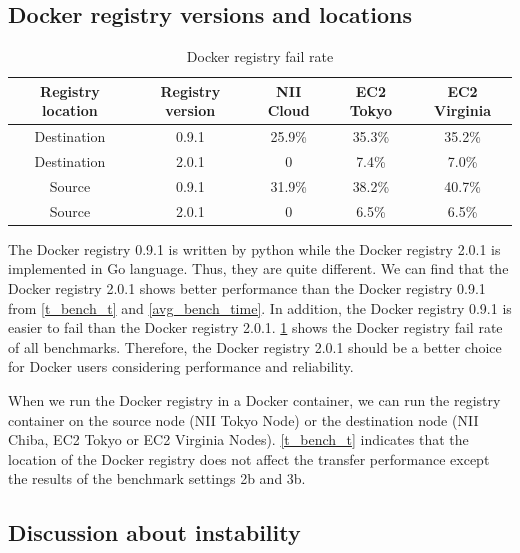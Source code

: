 \documentclass{ieicej}
\begin{document}
\subsection{Docker registry versions and locations}

\begin{table}
  \begin{tabular}{|c|c|c|c|c|}
\hline
Registry location & Registry version & NII Cloud & EC2 Tokyo & EC2 Virginia \\
\hline
Destination       & 0.9.1            & 25.9\%     & 35.3\% & 35.2\% \\
\hline
Destination       & 2.0.1            & 0         & 7.4\%  & 7.0\% \\
\hline
Source            &  0.9.1           & 31.9\%     & 38.2\% & 40.7\% \\
\hline
Source            &  2.0.1           & 0         & 6.5\%  & 6.5\% \\
  \end{tabular}
  \caption{Docker registry fail rate}
  \label{reg_fail_rate}
\end{table}


The Docker registry 0.9.1 is written by python while the Docker registry 2.0.1 is implemented in Go language.
Thus, they are quite different. We can find that the Docker registry 2.0.1 shows better performance than the Docker registry 0.9.1 from \cref{t_bench_t} and \cref{avg_bench_time}.
In addition, the Docker registry 0.9.1 is easier to fail than the Docker registry 2.0.1.
\cref{reg_fail_rate} shows the Docker registry fail rate of all benchmarks. Therefore, the Docker registry 2.0.1 should be a better choice for Docker users considering performance and reliability.

When we run the Docker registry in a Docker container, we can run the registry container on the source node (NII Tokyo Node) or the destination node (NII Chiba, EC2 Tokyo or EC2 Virginia Nodes).
\cref{t_bench_t} indicates that the location of the Docker registry does not affect the transfer performance except the results of the benchmark settings 2b and 3b.

\subsection{Discussion about instability}
\end{document}
